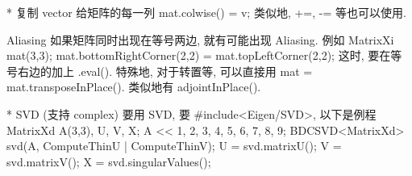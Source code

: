 * 复制 vector 给矩阵的每一列
mat.colwise() = v; 类似地, +=, -= 等也可以使用.

Aliasing
如果矩阵同时出现在等号两边, 就有可能出现 Aliasing. 例如 MatrixXi mat(3,3);  mat.bottomRightCorner(2,2) = mat.topLeftCorner(2,2); 这时, 要在等号右边的加上 .eval(). 特殊地, 对于转置等, 可以直接用 mat = mat.transposeInPlace(). 类似地有 adjointInPlace().

* SVD (支持 complex)
要用 SVD, 要 #include<Eigen/SVD>, 以下是例程
MatrixXd  A(3,3), U, V, X;
A << 1, 2, 3, 4, 5, 6, 7, 8, 9;
BDCSVD<MatrixXd> svd(A, ComputeThinU | ComputeThinV);
U = svd.matrixU(); V = svd.matrixV(); X = svd.singularValues();
